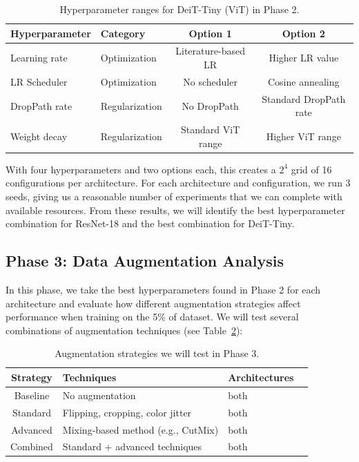 \documentclass[12pt,a4paper]{article}
\begin{document}
\begin{table}[H]
\centering
\caption{Hyperparameter ranges for DeiT-Tiny (ViT) in Phase 2.}
\label{tab:hp_deit}
\begin{tabular}{@{}llcc@{}}
\toprule
\textbf{Hyperparameter} & \textbf{Category} & \textbf{Option 1} & \textbf{Option 2} \\
\midrule
Learning rate & Optimization & Literature-based LR & Higher LR value \\
LR Scheduler & Optimization & No scheduler & Cosine annealing \\
DropPath rate & Regularization & No DropPath & Standard DropPath rate \\
Weight decay & Regularization & Standard ViT range & Higher ViT range \\
\bottomrule
\end{tabular}
\end{table}

With four hyperparameters and two options each, this creates a $2^4$ grid of 16 configurations per architecture. For each architecture and configuration, we run 3 seeds, giving us a reasonable number of experiments that we can complete with available resources. From these results, we will identify the best hyperparameter combination for ResNet-18 and the best combination for DeiT-Tiny.

\subsection{Phase 3: Data Augmentation Analysis}

In this phase, we take the best hyperparameters found in Phase 2 for each architecture and evaluate how different augmentation strategies affect performance when training on the 5\% of dataset. We will test several combinations of augmentation techniques (see Table~\ref{tab:aug_strategies}):

\begin{table}[H]
\centering
\caption{Augmentation strategies we will test in Phase 3.}
\label{tab:aug_strategies}
\begin{tabular}{@{}clll@{}}
\toprule
\textbf{Strategy} & \textbf{Techniques} & \textbf{Architectures} \\
\midrule
Baseline & No augmentation & both \\
Standard & Flipping, cropping, color jitter & both \\
Advanced & Mixing-based method (e.g., CutMix) & both \\
Combined & Standard + advanced techniques & both\\
\bottomrule
\end{tabular}
\end{table}
\end{document}
